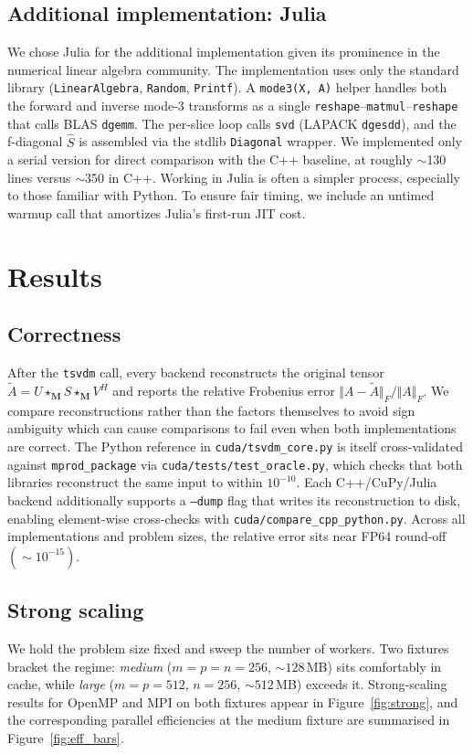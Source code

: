 \documentclass{article}
\begin{document}
\subsection{Additional implementation: Julia}
We chose Julia for the additional implementation given its prominence 
in the numerical linear algebra community. The implementation uses only the standard 
library (\texttt{LinearAlgebra}, \texttt{Random}, \texttt{Printf}). A 
\texttt{mode3(X, A)} helper handles both the forward and inverse mode-3 
transforms as a single \texttt{reshape}--\texttt{matmul}--\texttt{reshape} 
that calls BLAS \texttt{dgemm}. The per-slice loop calls \texttt{svd} 
(LAPACK \texttt{dgesdd}), and the f-diagonal $\hat{S}$ is assembled via 
the stdlib \texttt{Diagonal} wrapper. We implemented only a serial 
version for direct comparison with the C++ baseline, at roughly $\sim$130 
lines versus $\sim$350 in C++. Working in Julia is often a 
simpler process, especially to those familiar with Python. 
To ensure fair timing, we include an 
untimed warmup call that amortizes Julia's first-run JIT cost.


\section{Results}
\label{sec:results}

\subsection{Correctness}
\label{subsec:correctness}
After the \texttt{tsvdm} call, every backend reconstructs the original tensor
$\tilde{A} = U \star_\mathbf{M} S \star_\mathbf{M} V^H$ and reports the
relative Frobenius error $\Vert A - \tilde{A}\Vert_F / \Vert A \Vert_F$. We compare
reconstructions rather than the factors themselves to avoid sign ambiguity which can cause comparisons to fail even when
both implementations are correct. The Python reference in \texttt{cuda/tsvdm\_core.py} is itself cross-validated
against \texttt{mprod\_package} \cite{kilmer2021tensor} via
\texttt{cuda/tests/test\_oracle.py}, which checks that both libraries reconstruct the
same input to within $10^{-10}$. Each C++/CuPy/Julia backend additionally
supports a \texttt{--dump} flag that writes its reconstruction to disk, enabling element-wise cross-checks with
\texttt{cuda/compare\_cpp\_python.py}. Across all implementations and
problem sizes, the relative error sits near FP64 round-off$(\sim 10^{-15})$. 


\subsection{Strong scaling}
\label{subsec:strong}
We hold the problem size fixed and sweep the number of workers. Two
fixtures bracket the regime: \emph{medium} ($m=p=n=256$,
$\sim 128$\,MB) sits comfortably in cache, while \emph{large}
($m=p=512$, $n=256$, $\sim 512$\,MB) exceeds it. Strong-scaling
results for OpenMP and MPI on both fixtures appear in
Figure~\ref{fig:strong}, and the corresponding parallel efficiencies
at the medium fixture are summarised in
Figure~\ref{fig:eff_bars}.
\end{document}
